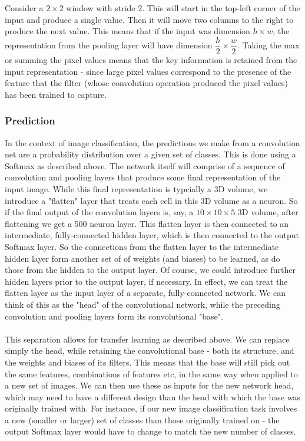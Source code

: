 \documentclass[11pt]{article} %
\theoremstyle{plain}
\theoremstyle{definition}
\begin{document}
\\
\\
\noindent
Consider a \(2 \times 2\) window with stride 2. This will start in the top-left corner of the input and produce a single value. Then it will move two columns to the right to produce the next value. This means that if the input was dimension \(h \times w\), the representation from the pooling layer will have dimension \(\dfrac{h}{2} \times \dfrac{w}{2}\). Taking the max or summing the pixel values means that the key information is retained from the input representation - since large pixel values correspond to the presence of the feature that the filter (whose convolution operation produced the pixel values) has been trained to capture. 

\subsubsection{Prediction}
In the context of image classification, the predictions we make from a convolution net are a probability distribution over a given set of classes. This is done using a Softmax as described above. The network itself will comprise of a sequence of convolution and pooling layers that produce some final representation of the input image. While this final representation is typcially a 3D volume, we introduce a "flatten" layer that treats each cell in this 3D volume as a neuron. So if the final output of the convolution layers is, say, a \(10 \times 10 \times 5\) 3D volume, after flattening we get a 500 neuron layer. This flatten layer is then connected to an intermediate, fully-connected hidden layer, which is then connected to the output Softmax layer. So the connections from the flatten layer to the intermediate hidden layer form another set of of weights (and biases) to be learned, as do those from the hidden to the output layer. Of course, we could introduce further hidden layers prior to the output layer, if necessary. In effect, we can treat the flatten layer as the input layer of a separate, fully-connected network. We can think of this as the "head" of the convolutional network, while the preceding convolution and pooling layers form its convolutional "base".
\\
\\
\noindent
This separation allows for transfer learning as described above. We can replace simply the head, while retaining the convolutional base - both its structure, and the weights and biases of its filters. This means that the base will still pick out the same features, combinations of features etc, in the same way when applied to a new set of images. We can then use these as inputs for the new network head, which may need to have a different design than the head with which the base was originally trained with. For instance, if our new image classification task involves a new (smaller or larger) set of classes than those originally trained on - the output Softmax layer would have to change to match the new number of classes.
\end{document}
